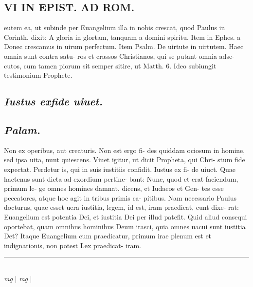 \documentclass{article}
\begin{document}
\begin{pages}
\section*{VI IN EPIST. AD ROM.  }
\marginpar{[ p.]}\pstart eutem ea, ut subinde per Euangelium illa in nobis crescat, quod Paulus in Corinth. dixit: A gloria in glortam, tanquam a domini spiritu. Item in Ephes. a Donec crescamus in uirum perfectum. Item Psalm.  De uirtute in uirtutem. Haec omnia sunt contra satu- ros et crassos Christianos, qui se putant omnia adse- cutos, cum tamen piorum sit semper sitire, ut Matth. 6.  Ideo subiungit testimonium Prophete.   \pend
{}
{}
\subsection*{\textit{Iustus exfide uiuet. }}
{}
\subsection*{\textit{Palam. }}\pstart Non ex operibus, aut creaturis. Non est ergo fi- des quiddam ociosum in homine, sed ipsa uita, nunt quiescens. Viuet igitur, ut dicit Propheta, qui Chri- stum fide expectat. Perdetur is, qui in suis iustitiis confidit.  Iustus ex fi- de uiuct.   \pend\pstart Quae hactenus sunt dicta ad exordium pertine- bant: Nunc, quod et erat faciendum, primum le- ge omnes homines damnat, dicens, et Iudaeos et Gen- tes esse peccatores, atque hoc agit in tribus primis ca- pitibus. Nam necessario Paulus docturus, quae esset uera iustitia, legem, id est, iram praedicat, cunt dixe- rat: Euangelium est potentia Dei, et iustitia Dei per illud patefit. Quid aliud consequi oportebat, quam omnibus hominibus Deum irasci, quia omnes uacui sunt iustitia Det? Itaque Euangelium cum praedicatur, primum irae plenum est et indignationis, non potest Lex praedicat- iram.   \pend
\vspace{0.5cm}\noindent
\vspace{0.2cm}\rule{1cm}{0.2pt}\\ 
\hspace{0.2cm}\textit{mg}
\footnotesize 
\normalsize| 
\hspace{0.2cm}\textit{mg}
\footnotesize 
\normalsize| 

\end{pages}
\end{document}

